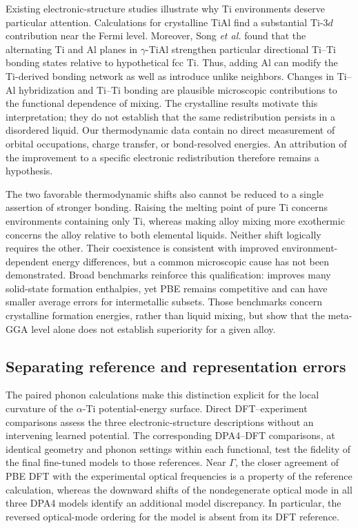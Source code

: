 Existing electronic-structure studies illustrate why Ti environments deserve particular attention.
Calculations for crystalline TiAl find a substantial Ti-$3d$ contribution near the Fermi level.\cite{Hussain2011}
Moreover, Song \textit{et al.}\cite{Song1994} found that the alternating Ti and Al planes in $\gamma$-TiAl strengthen particular directional Ti--Ti bonding states relative to hypothetical fcc Ti.
Thus, adding Al can modify the Ti-derived bonding network as well as introduce unlike neighbors.
Changes in Ti--Al hybridization and Ti--Ti bonding are plausible microscopic contributions to the functional dependence of mixing.
The crystalline results motivate this interpretation; they do not establish that the same redistribution persists in a disordered liquid.
Our thermodynamic data contain no direct measurement of orbital occupations, charge transfer, or bond-resolved energies.
An attribution of the \rscan{} improvement to a specific electronic redistribution therefore remains a hypothesis.

The two favorable thermodynamic shifts also cannot be reduced to a single assertion of stronger bonding.
Raising the melting point of pure Ti concerns environments containing only Ti, whereas making alloy mixing more exothermic concerns the alloy relative to both elemental liquids.
Neither shift logically requires the other.
Their coexistence is consistent with improved environment-dependent energy differences, but a common microscopic cause has not been demonstrated.
Broad benchmarks reinforce this qualification: \rscan{} improves many solid-state formation enthalpies, yet PBE remains competitive and can have smaller average errors for intermetallic subsets.\cite{Kothakonda2023}
Those benchmarks concern crystalline formation energies, rather than liquid mixing, but show that the meta-GGA level alone does not establish superiority for a given alloy.

\subsection{Separating reference and representation errors}

The paired phonon calculations make this distinction explicit for the local curvature of the $\alpha$-Ti potential-energy surface.
Direct DFT--experiment comparisons assess the three electronic-structure descriptions without an intervening learned potential.
The corresponding DPA4--DFT comparisons, at identical geometry and phonon settings within each functional, test the fidelity of the final fine-tuned models to those references.
Near $\Gamma$, the closer agreement of PBE DFT with the experimental optical frequencies is a property of the reference calculation, whereas the downward shifts of the nondegenerate optical mode in all three DPA4 models identify an additional model discrepancy.
In particular, the reversed optical-mode ordering for the \rscan{} model is absent from its DFT reference.

